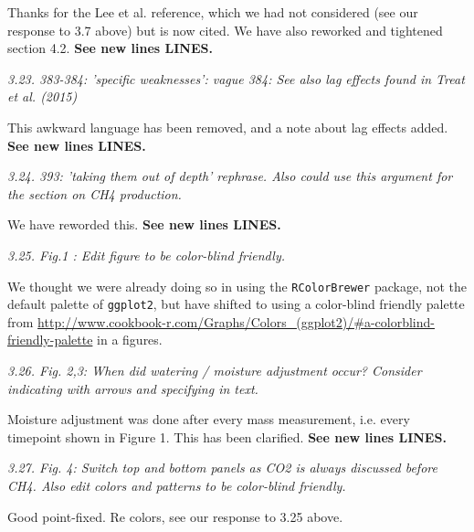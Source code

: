 \documentclass[11pt, oneside]{article}
\begin{document}
Thanks for the Lee et al. reference, which we had not considered (see our response to 3.7 above) but is now cited. We have also reworked and tightened section 4.2. {\bf See new lines LINES.}

\medskip
{\it 3.23. 383-384: 'specific weaknesses': vague
384: See also lag effects found in Treat et al. (2015) }

This awkward language has been removed, and a note about lag effects added. {\bf See new lines LINES.}

\medskip
{\it 3.24. 393: 'taking them out of depth' rephrase. Also could use this argument for the section on CH4 production. }

We have reworded this. {\bf See new lines LINES.}

\medskip
{\it 3.25. Fig.1 : Edit figure to be color-blind friendly. }

We thought we were already doing so in using the {\tt RColorBrewer} package, not the default palette of {\tt ggplot2}, but have shifted to using a color-blind friendly palette from \url{http://www.cookbook-r.com/Graphs/Colors_(ggplot2)/#a-colorblind-friendly-palette} in a figures.

\medskip
{\it 3.26. Fig. 2,3: When did watering / moisture adjustment occur? Consider indicating with arrows and specifying in text. }

Moisture adjustment was done after every mass measurement, i.e. every timepoint shown in Figure 1. This has been clarified. {\bf See new lines LINES.}

\medskip
{\it 3.27. Fig. 4: Switch top and bottom panels as CO2 is always discussed before CH4. Also edit colors and patterns to be color-blind friendly. }

Good point-fixed. Re colors, see our response to 3.25 above.
\end{document}
